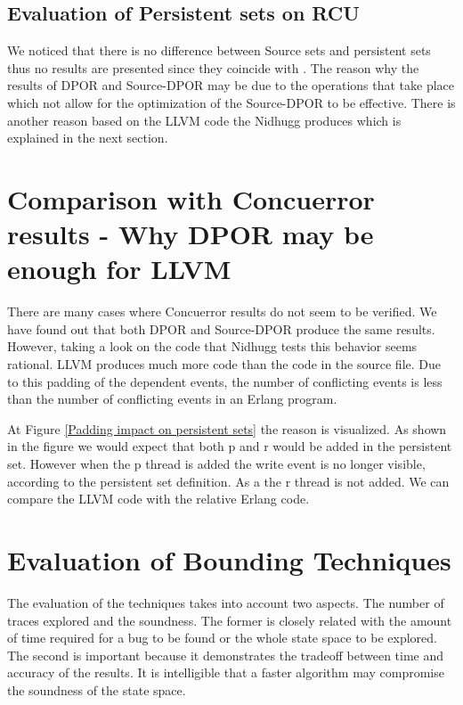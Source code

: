 

\subsection{Evaluation of Persistent sets on RCU}
We noticed that there is no difference between Source sets and persistent sets thus no results are presented since they coincide with \cite{Spin}. 
The reason why the results of DPOR and Source-DPOR may be due to the operations that take place which not allow for the optimization of the Source-DPOR 
to be effective. There is another reason based on the LLVM code the Nidhugg produces which is explained in the next section.

\section{Comparison with Concuerror results - Why DPOR may be enough for LLVM}
There are many cases where Concuerror results do not seem to be verified. We have found out that both DPOR and Source-DPOR produce the same results. However, taking a look on the code that Nidhugg tests this behavior seems rational.
LLVM produces much more code than the code in the source file. Due to this padding of the dependent events, the number of conflicting events is less than the 
number of conflicting events in an Erlang program.

At Figure \ref{Padding impact on persistent sets} the reason is visualized. As shown in the figure we would expect that both p and r would be added in the persistent set. However when the p thread is added the write event is no longer visible, 
according to the persistent set definition. As a the r thread is not added. We can compare the LLVM code with the relative Erlang code.




\section{Evaluation of Bounding Techniques}
The evaluation of the techniques takes into account two aspects. The number of traces explored and the soundness. The former is closely related with the amount
of time required for a bug to be found or the whole state space to be explored. The second is important because it demonstrates the tradeoff between time and accuracy
of the results. It is intelligible that a faster algorithm may compromise the soundness of the state space.
